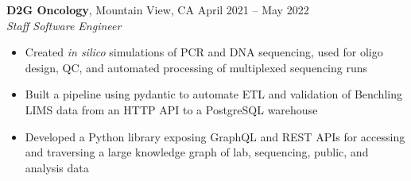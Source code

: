 \documentclass[margin,line]{resume}
\begin{document}
\begin{resume}
    \textbf{D2G Oncology}, Mountain View, CA \hfill\vspace{1mm}\hfill April 2021 -- May 2022\\%
    \textsl{Staff Software Engineer}
    \begin{itemize}
    \item Created \textit{in silico} simulations of PCR and DNA sequencing, used for oligo design, QC, and automated processing of multiplexed sequencing runs
    \item Built a pipeline using pydantic to automate ETL and validation of Benchling LIMS data from an HTTP API to a PostgreSQL warehouse
    \item Developed a Python library exposing GraphQL and REST APIs for accessing and traversing a large knowledge graph of lab, sequencing, public, and analysis data
    \end{itemize}


\end{resume}
\end{document}
